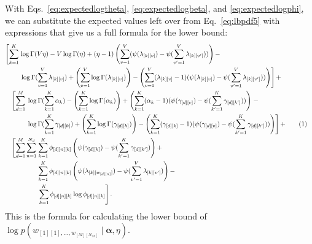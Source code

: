 \documentclass[12pt]{article}
\newcommand\numberthis{\addtocounter{equation}{1}\tag{\theequation}}
\begin{document}
With Eqs.~\ref{eq:expectedlogtheta}, \ref{eq:expectedlogbeta}, and
\ref{eq:expectedlogphi}, we can substitute the expected values left over from
Eq.~\ref{eq:lbpdf5} with expressions that give us a full formula for the lower
bound:
\begin{align*}
    &\begin{aligned}
    &\begin{aligned}\left[\sum_{k=1}^{K} \right. &\log \Gamma(V\eta)
    - V \log \Gamma(\eta) + (\eta - 1) \left(\sum_{v=1}^{V}
    (\psi(\lambda_{[k][v]}) - \psi(\sum_{v'=1}^{V} \lambda_{[k][v']}))\right) -
    \\*
    &\left. \log \Gamma(\sum_{v=1}^{V} \lambda_{[k][v]}) +
    \left(\sum_{v=1}^{V} \log \Gamma(\lambda_{[k][v]}) \right) -
    \left(\sum_{v=1}^{V} (\lambda_{[k][v]} - 1)
    (\psi(\lambda_{[k][v]}) - \psi(\sum_{v'=1}^{V} \lambda_{[k][v']}))
    \right)\right] +\end{aligned} \\*
    &\quad\begin{aligned}\left[\sum_{d=1}^{M}\right. &\left.\log \Gamma
    (\sum_{k=1}^{K} \alpha_{k}) -
    \left(\sum_{k=1}^{K}\log \Gamma(\alpha_{k})\right) +
    \left(\sum_{k=1}^{K}(\alpha_{k} - 1)
    (\psi(\gamma_{[d][v]}) - \psi(\sum_{k'=1}^{K} \gamma_{[d][k']}))
    \right)
    \right. - \\*
    &\left.\log \Gamma(\sum_{k=1}^{K} \gamma_{[d][k]}) +
    \left(\sum_{k=1}^{K} \log \Gamma(\gamma_{[d][k]})\right) -
    \left(\sum_{k=1}^{K} (\gamma_{[d][k]} - 1)
    (\psi(\gamma_{[d][v]}) - \psi(\sum_{k'=1}^{K} \gamma_{[d][k']}))
    \right)\right] +
    \end{aligned}\\*
    &\quad\begin{aligned}
    \left[\sum_{d=1}^{M}\sum_{n=1}^{N_{d}}\right. &\sum_{k=1}^{K} \phi_{[d][n][k]}
    \left(\psi(\gamma_{[d][k]}) - \psi(\sum_{k'=1}^{K} \gamma_{[d][k']})\right)
    + \\ &\sum_{k=1}^{K} \phi_{[d][n][k]}
    \left(\psi(\lambda_{[k][w_{[d][n]}]}) - \psi(\sum_{v'=1}^{V}
    \lambda_{[k][v']})\right) - \\*
    &\left.\sum_{k=1}^{K} \phi_{[d][n][k]} \log \phi_{[d][n][k]}\right].
    \end{aligned}
    \end{aligned}
    \numberthis\label{eq:lowerboundformula}
\end{align*}
This is the formula for calculating the lower bound of $\log p(w_{[1][1],
\ldots, w_{[M][N_{M}]}} \mid \bm{\alpha}, \eta)$.
\end{document}
